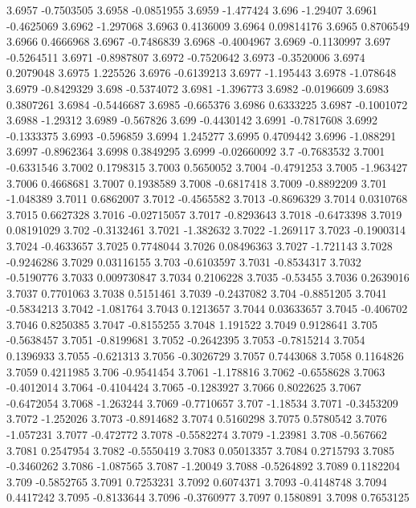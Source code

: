 3.6957  -0.7503505
3.6958  -0.0851955
3.6959  -1.477424
3.696  -1.29407
3.6961  -0.4625069
3.6962  -1.297068
3.6963  0.4136009
3.6964  0.09814176
3.6965  0.8706549
3.6966  0.4666968
3.6967  -0.7486839
3.6968  -0.4004967
3.6969  -0.1130997
3.697  -0.5264511
3.6971  -0.8987807
3.6972  -0.7520642
3.6973  -0.3520006
3.6974  0.2079048
3.6975  1.225526
3.6976  -0.6139213
3.6977  -1.195443
3.6978  -1.078648
3.6979  -0.8429329
3.698  -0.5374072
3.6981  -1.396773
3.6982  -0.0196609
3.6983  0.3807261
3.6984  -0.5446687
3.6985  -0.665376
3.6986  0.6333225
3.6987  -0.1001072
3.6988  -1.29312
3.6989  -0.567826
3.699  -0.4430142
3.6991  -0.7817608
3.6992  -0.1333375
3.6993  -0.596859
3.6994  1.245277
3.6995  0.4709442
3.6996  -1.088291
3.6997  -0.8962364
3.6998  0.3849295
3.6999  -0.02660092
3.7  -0.7683532
3.7001  -0.6331546
3.7002  0.1798315
3.7003  0.5650052
3.7004  -0.4791253
3.7005  -1.963427
3.7006  0.4668681
3.7007  0.1938589
3.7008  -0.6817418
3.7009  -0.8892209
3.701  -1.048389
3.7011  0.6862007
3.7012  -0.4565582
3.7013  -0.8696329
3.7014  0.0310768
3.7015  0.6627328
3.7016  -0.02715057
3.7017  -0.8293643
3.7018  -0.6473398
3.7019  0.08191029
3.702  -0.3132461
3.7021  -1.382632
3.7022  -1.269117
3.7023  -0.1900314
3.7024  -0.4633657
3.7025  0.7748044
3.7026  0.08496363
3.7027  -1.721143
3.7028  -0.9246286
3.7029  0.03116155
3.703  -0.6103597
3.7031  -0.8534317
3.7032  -0.5190776
3.7033  0.009730847
3.7034  0.2106228
3.7035  -0.53455
3.7036  0.2639016
3.7037  0.7701063
3.7038  0.5151461
3.7039  -0.2437082
3.704  -0.8851205
3.7041  -0.5834213
3.7042  -1.081764
3.7043  0.1213657
3.7044  0.03633657
3.7045  -0.406702
3.7046  0.8250385
3.7047  -0.8155255
3.7048  1.191522
3.7049  0.9128641
3.705  -0.5638457
3.7051  -0.8199681
3.7052  -0.2642395
3.7053  -0.7815214
3.7054  0.1396933
3.7055  -0.621313
3.7056  -0.3026729
3.7057  0.7443068
3.7058  0.1164826
3.7059  0.4211985
3.706  -0.9541454
3.7061  -1.178816
3.7062  -0.6558628
3.7063  -0.4012014
3.7064  -0.4104424
3.7065  -0.1283927
3.7066  0.8022625
3.7067  -0.6472054
3.7068  -1.263244
3.7069  -0.7710657
3.707  -1.18534
3.7071  -0.3453209
3.7072  -1.252026
3.7073  -0.8914682
3.7074  0.5160298
3.7075  0.5780542
3.7076  -1.057231
3.7077  -0.472772
3.7078  -0.5582274
3.7079  -1.23981
3.708  -0.567662
3.7081  0.2547954
3.7082  -0.5550419
3.7083  0.05013357
3.7084  0.2715793
3.7085  -0.3460262
3.7086  -1.087565
3.7087  -1.20049
3.7088  -0.5264892
3.7089  0.1182204
3.709  -0.5852765
3.7091  0.7253231
3.7092  0.6074371
3.7093  -0.4148748
3.7094  0.4417242
3.7095  -0.8133644
3.7096  -0.3760977
3.7097  0.1580891
3.7098  0.7653125
